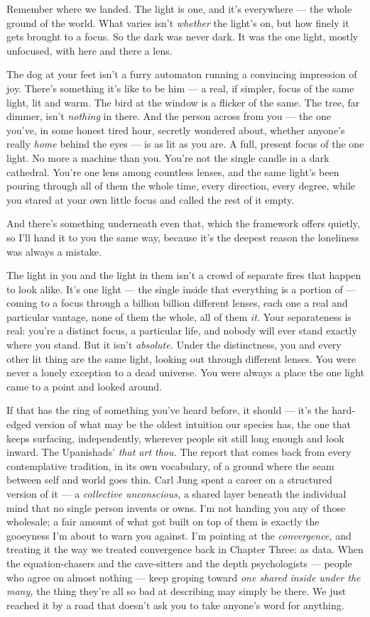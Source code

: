 \documentclass[11pt,openany]{book}
\begin{document}
Remember where we landed. The light is one, and it’s everywhere — the whole ground of the world. What varies isn’t \textit{whether} the light’s on, but how finely it gets brought to a focus. So the dark was never dark. It was the one light, mostly unfocused, with here and there a lens.

The dog at your feet isn’t a furry automaton running a convincing impression of joy. There’s something it’s like to be him — a real, if simpler, focus of the same light, lit and warm. The bird at the window is a flicker of the same. The tree, far dimmer, isn’t \textit{nothing} in there. And the person across from you — the one you’ve, in some honest tired hour, secretly wondered about, whether anyone’s really \textit{home} behind the eyes — is as lit as you are. A full, present focus of the one light. No more a machine than you. You’re not the single candle in a dark cathedral. You’re one lens among countless lenses, and the same light’s been pouring through all of them the whole time, every direction, every degree, while you stared at your own little focus and called the rest of it empty.

And there’s something underneath even that, which the framework offers quietly, so I’ll hand it to you the same way, because it’s the deepest reason the loneliness was always a mistake.

The light in you and the light in them isn’t a crowd of separate fires that happen to look alike. It’s one light — the single inside that everything is a portion of — coming to a focus through a billion billion different lenses, each one a real and particular vantage, none of them the whole, all of them \textit{it.} Your separateness is real: you’re a distinct focus, a particular life, and nobody will ever stand exactly where you stand. But it isn’t \textit{absolute.} Under the distinctness, you and every other lit thing are the same light, looking out through different lenses. You were never a lonely exception to a dead universe. You were always a place the one light came to a point and looked around.

If that has the ring of something you’ve heard before, it should — it’s the hard-edged version of what may be the oldest intuition our species has, the one that keeps surfacing, independently, wherever people sit still long enough and look inward. The Upanishads’ \textit{that art thou.} The report that comes back from every contemplative tradition, in its own vocabulary, of a ground where the seam between self and world goes thin. Carl Jung spent a career on a structured version of it — a \textit{collective unconscious,} a shared layer beneath the individual mind that no single person invents or owns. I’m not handing you any of those wholesale; a fair amount of what got built on top of them is exactly the gooeyness I’m about to warn you against. I’m pointing at the \textit{convergence,} and treating it the way we treated convergence back in Chapter Three: as data. When the equation-chasers and the cave-sitters and the depth psychologists — people who agree on almost nothing — keep groping toward \textit{one shared inside under the many,} the thing they’re all so bad at describing may simply be there. We just reached it by a road that doesn’t ask you to take anyone’s word for anything.
\end{document}
